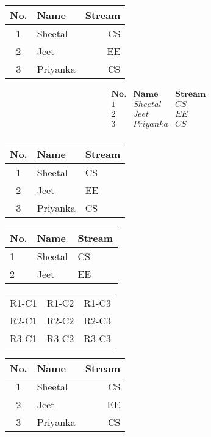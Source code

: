 \documentclass[preview, border=1pt, varwidth]{standalone}
\begin{document}
\begin{tabular}{|c|l|r|}
\hline
No. & Name & Stream \\
\hline
1 & Sheetal & CS \\
2 & Jeet & EE \\
3 & Priyanka & CS \\
\hline
\end{tabular}

\[
\begin{array}{clr}
\textbf{No.} & \textbf{Name} & \textbf{Stream} \\
1 & Sheetal & CS \\
2 & Jeet & EE \\
3 & Priyanka & CS \\
\end{array}
\]

\begin{tabular}{|c|l|l|}
\hline
No. & Name & Stream \\
\hline
1 & Sheetal & CS \\
2 & Jeet & EE \\
3 & Priyanka & CS \\
\hline
\end{tabular}

\begin{tabular}{|p{1cm}|p{5cm}|p{3cm}|}
\hline
No. & Name & Stream \\
\hline
1 & Sheetal & CS \\
\hline
2 & Jeet & EE \\
\hline
\end{tabular}

\begin{tabular}{ccc}
\hline
R1-C1 & R1-C2 & R1-C3 \\
\cline{1-2}  %
R2-C1 & R2-C2 & R2-C3 \\
\cline{2-3}  %
R3-C1 & R3-C2 & R3-C3 \\
\hline
\end{tabular}

\renewcommand{\arraystretch}{2} %
\begin{tabular}{clr}
\hline
No. & Name    & Stream \\
\hline
1   & Sheetal & CS     \\
2   & Jeet    & EE     \\
3   & Priyanka & CS    \\
\hline
\end{tabular}
\end{document}
